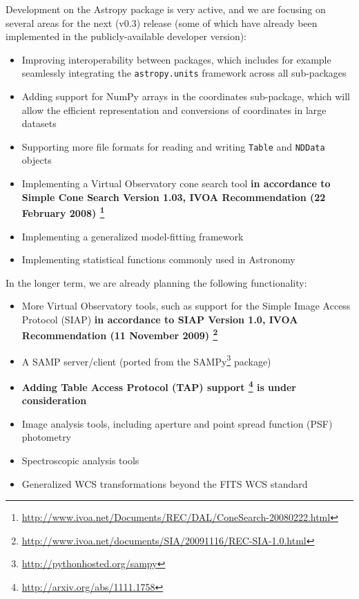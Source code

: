 \documentclass[traditabstract]{aa}
\begin{document}
\label{sec:future}


Development on the Astropy package is very active, and we are focusing on several areas for
the next (v0.3) release (some of which have already been implemented in the
publicly-available developer version):

\begin{itemize}
\item Improving interoperability between packages, which includes for example seamlessly integrating the \texttt{astropy.units} framework across all sub-packages
\item Adding support for NumPy arrays in the coordinates sub-package, which will allow the efficient representation and conversions of coordinates in large datasets
\item Supporting more file formats for reading and writing \texttt{Table} and \texttt{NDData} objects
\item Implementing a Virtual Observatory cone search tool \textbf{in accordance to Simple Cone Search Version 1.03, IVOA Recommendation (22 February 2008) \footnote{\url{http://www.ivoa.net/Documents/REC/DAL/ConeSearch-20080222.html}}}
\item Implementing a generalized model-fitting framework
\item Implementing statistical functions commonly used in Astronomy
\end{itemize}

In the longer term, we are already planning the following functionality:

\begin{itemize}
\item More Virtual Observatory tools, such as support for the Simple Image Access Protocol (SIAP) \textbf{in accordance to SIAP Version 1.0, IVOA Recommendation (11 November 2009) \footnote{\url{http://www.ivoa.net/documents/SIA/20091116/REC-SIA-1.0.html}}}
\item A SAMP server/client (ported from the SAMPy\footnote{\url{http://pythonhosted.org/sampy}} package)
\item \textbf{Adding Table Access Protocol (TAP) support \footnote{\url{http://arxiv.org/abs/1111.1758}} is under consideration}
\item Image analysis tools, including aperture and point spread function (PSF) photometry
\item Spectroscopic analysis tools
\item Generalized WCS transformations beyond the FITS WCS standard
\end{itemize}
\end{document}
